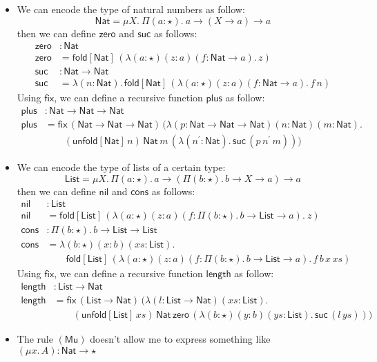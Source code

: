 \documentclass[oneside,a4paper]{article}
\numberwithin{equation}{section}
\newcommand{\fold}[2]{\mathsf{fold}[#1]\,#2}
\newcommand{\unfold}[2]{\mathsf{unfold}[#1]\,#2}
\begin{document}
\begin{itemize}
  \newcommand{\Nat}{\mathsf{Nat}} \newcommand{\zero}{\mathsf{zero}}
  \newcommand{\suc}{\mathsf{suc}} \newcommand{\plus}{\mathsf{plus}}
  \newcommand{\List}{\mathsf{List}} \newcommand{\nil}{\mathsf{nil}}
  \newcommand{\cons}{\mathsf{cons}}
  \newcommand{\length}{\mathsf{length}}
  \newcommand{\PlFunc}{\Nat\rightarrow\Nat\rightarrow\Nat}

\item We can encode the type of natural numbers as follow:
  \[
  \Nat = \mu X.\ \Pi(a : \star).\ a \rightarrow (X \rightarrow a) \rightarrow a
  \]
  then we can define $\zero$ and $\suc$ as follows:
  \begin{align*}
    \zero &: \Nat \\
    \zero &= \fold{\Nat}{(\lambda (a : \star) (z : a) (f : \Nat \rightarrow a).\,z)}\\
    \suc &: \Nat \rightarrow \Nat\\
    \suc &= \lambda (n : \Nat).\,\fold{\Nat}{(\lambda (a : \star) (z : a) (f : \Nat \rightarrow a).\,f\,n)}
  \end{align*}
  Using $\mathsf{fix}$, we can define a recursive function $\plus$ as
  follow:
  \begin{align*}
    \plus &:\PlFunc\\
    \plus &=\mathsf{fix}\,(\PlFunc)\,(\lambda(p : \PlFunc)(n : \Nat)(m : \Nat).\\
          &\qquad (\unfold{\Nat}{n})\,\Nat\,m\,(\lambda (n^{\prime} : \Nat).\,\suc\,(p\,n^{\prime}\,m)))
  \end{align*}
\item We can encode the type of lists of a certain type:
  \[
  \List = \mu X.\,\Pi(a : \star).\,a \rightarrow (\Pi (b : \star).\,b \rightarrow X \rightarrow a) \rightarrow a
  \]
  then we can define $\nil$ and $\cons$ as follows:
  \begin{align*}
    \nil &: \List\\
    \nil &= \fold{\List}{(\lambda (a : \star) (z : a) (f : \Pi (b : \star).\,b \rightarrow \List \rightarrow a).\ z)}\\
    \cons &: \Pi (b : \star).\,b \rightarrow \List \rightarrow \List\\
    \cons &= \lambda(b : \star)(x : b)(xs : \List).\\
         &\qquad \fold{\List}{(\lambda(a : \star)(z : a)(f : \Pi (b : \star).\,b\rightarrow \List \rightarrow a).\,f\,b\,x\,xs)}
  \end{align*}
  Using $\mathsf{fix}$, we can define a recursive function $\length$
  as follow:
  \begin{align*}
    \length &: \List \rightarrow \Nat\\
    \length &= \mathsf{fix}\,(\List \rightarrow \Nat)\,(\lambda(l : \List
              \rightarrow \Nat)(xs : \List).\\
            &\qquad (\unfold{\List}{xs})\,\Nat\,\zero\,(\lambda(b : \star)(y : b)(ys : \List).\,\suc\,(l\,ys)))
  \end{align*}
\item The rule $(\mathsf{Mu})$ doesn't allow me to express something
  like $(\mu x.\,A) : \Nat \rightarrow \star$
\end{itemize}
\end{document}
